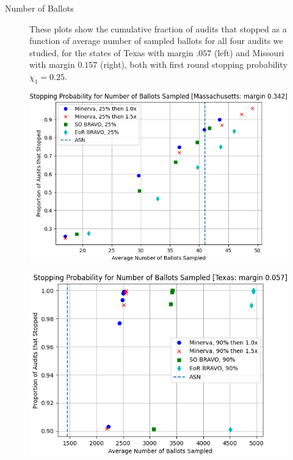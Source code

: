 \documentclass[final]{beamer}
\newlength{\colwidth}
\begin{document}
\begin{frame}[t]
\begin{columns}[t]
\begin{column}{\colwidth}
\begin{block}{Number of Ballots}
\begin{figure}[h]
\begin{minipage}{.49\textwidth}
\begin{centering}
\label{fig:missouri_25}
\end{centering}
\end{minipage}
\caption{These plots show the cumulative fraction of audits that stopped as a function of average number of sampled ballots for all four audits we studied, for the states of Texas with margin $.057$ (left) and Missouri with margin $0.157$ (right), both with first round stopping probability $\chi_1=0.25$.}
\end{figure}

\begin{figure}[h]
\centering
\begin{minipage}{.49\textwidth}
\begin{centering}
\includegraphics[width=1\textwidth]{massachusetts25.png}
\label{fig:mass_25}
\end{centering}
\end{minipage}
\begin{minipage}{.49\textwidth}
\begin{centering}
\includegraphics[width=1\textwidth]{texas90.png}

\end{centering}
\end{minipage}
\end{figure}
\end{block}
\end{column}
\end{columns}
\end{frame}
\end{document}
